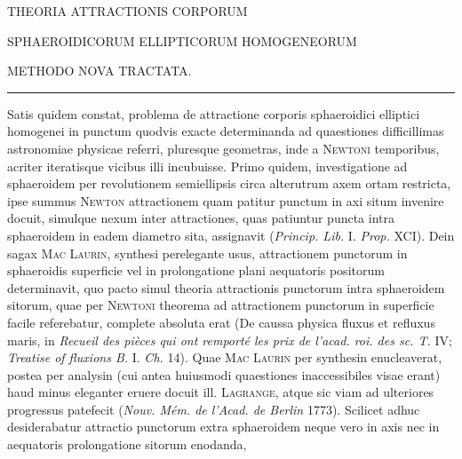 \begin{center}
THEORIA ATTRACTIONIS CORPORUM\par
\bigskip
SPHAEROIDICORUM ELLIPTICORUM HOMOGENEORUM\par
\bigskip
METHODO NOVA TRACTATA.\par
\medskip
\rule{.16\textwidth}{.3pt}
\end{center}
\par
Satis quidem constat, problema de attractione corporis sphaeroidici elliptici homogenei in punctum quodvis exacte determinanda ad quaestiones difficillimas astronomiae physicae referri, pluresque geometras, inde a \textsc{Newtoni} temporibus, acriter iteratisque vicibus illi incubuisse. Primo quidem, investigatione ad sphaeroidem per revolutionem semiellipsis circa alterutrum axem ortam restricta, ipse summus \textsc{Newton} attractionem quam patitur punctum in axi situm invenire docuit, simulque nexum inter attractiones, quas patiuntur puncta intra sphaeroidem in eadem diametro sita, assignavit (\textit{Princip. Lib.} I. \textit{Prop.} XCI). Dein sagax \textsc{Mac Laurin}, synthesi perelegante usus, attractionem punctorum in sphaeroidis superficie vel in prolongatione plani aequatoris positorum determinavit, quo pacto simul theoria attractionis punctorum intra sphaeroidem sitorum, quae per \textsc{Newtoni} theorema ad attractionem punctorum in superficie facile referebatur, complete absoluta erat (De caussa physica fluxus et refluxus maris, in \textit{Recueil des pièces qui ont remporté les prix de l’acad. roi. des sc. T.} IV; \textit{Treatise of fluxions B.} I. \textit{Ch.} 14). Quae \textsc{Mac Laurin} per synthesin enucleaverat, postea per analysin (cui antea huiusmodi quaestiones inaccessibiles visae erant) haud minus eleganter eruere docuit ill. \textsc{Lagrange}, atque sic viam ad ulteriores progressus patefecit (\textit{Nouv. Mém. de l’Acad. de Berlin} 1773). Scilicet adhuc desiderabatur attractio punctorum extra sphaeroidem neque vero in axis nec in aequatoris prolongatione sitorum enodanda,
